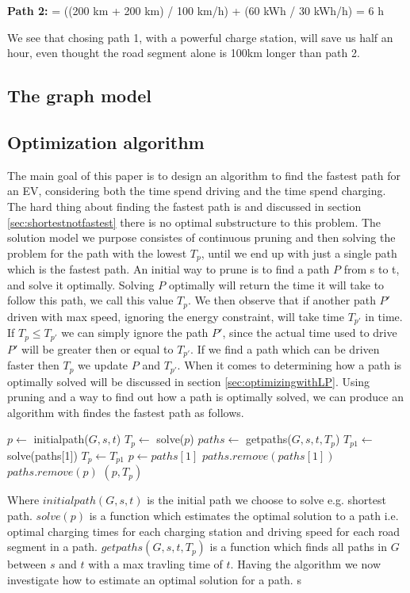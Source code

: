 \textbf{Path 2:}  = ((200 km + 200 km) / 100 km/h) + (60 kWh / 30 kWh/h) = 6 h
 
We see that chosing path 1, with a powerful charge station, will save us half an hour, even thought the road segment alone is 100km longer than path 2.

\subsection{The graph model}

\subsection{Optimization algorithm}
The main goal of this paper is to design an algorithm to find the fastest path for an EV, considering both the time spend driving and the time spend charging. The hard thing about finding the fastest path is and discussed in section \ref{sec:shortestnotfastest} there is no optimal substructure to this problem. The solution model we purpose consistes of continuous pruning and then solving the problem for the path with the lowest $T_p$, until we end up with just a single path which is the fastest path. An initial way to prune is to find a path $P$ from s to t, and solve it optimally. Solving $P$ optimally will return the time it will take to follow this path, we call this value $T_p$. We then observe that if another path $P'$ driven with max speed, ignoring the energy constraint, will take time $T_{p'}$ in time. If $T_p \leq T_{p'}$ we can simply ignore the path $P'$, since the actual time used to drive $P'$ will be greater then or equal to $T_{p'}$. If we find a path which can be driven faster then $T_p$ we update $P$ and $T_{p'}$. When it comes to determining how a path is optimally solved will be discussed in section \ref{sec:optimizingwithLP}. Using pruning and a way to find out how a path is optimally solved, we can produce an algorithm with findes the fastest path as follows. 
\begin{algorithmic}
    \State $p \gets$ initialpath($G,s,t$)
    \State $T_p \gets$ solve($p$)
    \State $paths \gets$ getpaths($G,s,t,T_p$)
    \Repeat 
    	\State $T_{p1} \gets$ solve(paths[1])
    		\State $T_p \gets T_{p1}$
    		\State $p \gets paths[1]$ 
    	\EndIf 
    	\State $paths.remove(paths[1])$
    			\State $paths.remove(p)$
    		\EndIf
    	\EndFor
    \State \Return $(p, T_p)$
\EndFunction
\end{algorithmic}
Where $initialpath(G,s,t)$ is the initial path we choose to solve e.g. shortest path. $solve(p)$ is a function which estimates the optimal solution to a path i.e. optimal charging times for each charging station and driving speed for each road segment in a path. $getpaths(G,s,t,T_p)$ is a function which finds all paths in $G$ between $s$ and $t$ with a max travling time of $t$. Having the algorithm we now investigate how to estimate an optimal solution for a path. s    

